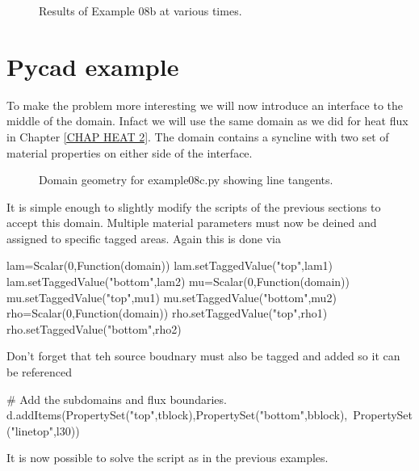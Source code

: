 \begin{figure}[htp]
{\label{fig:ex08pw880}
}
\label{fig:ex08pw}
\caption{Results of Example 08b at various times.}
\end{figure}
\clearpage

\section{Pycad example}
To make the problem more interesting we will now introduce an interface to the
middle of the domain. Infact we will use the same domain as we did for heat flux
in Chapter \ref{CHAP HEAT 2}. The domain contains a syncline with two set of
material properties on either side of the interface.

\begin{figure}[ht]
\begin{center}
\caption{Domain geometry for example08c.py showing line tangents.}
\label{fig:ex08cgeo}
\end{center}
\end{figure}

It is simple enough to slightly modify the scripts of the previous sections to
accept this domain. Multiple material parameters must now be deined and assigned
to specific tagged areas. Again this is done via
\begin{python}
lam=Scalar(0,Function(domain))
lam.setTaggedValue("top",lam1)
lam.setTaggedValue("bottom",lam2)
mu=Scalar(0,Function(domain))
mu.setTaggedValue("top",mu1)
mu.setTaggedValue("bottom",mu2)
rho=Scalar(0,Function(domain))
rho.setTaggedValue("top",rho1)
rho.setTaggedValue("bottom",rho2)
\end{python}
Don't forget that teh source boudnary must also be tagged and added so it can be
referenced 
\begin{python}
# Add the subdomains and flux boundaries.
d.addItems(PropertySet("top",tblock),PropertySet("bottom",bblock),\
                                     PropertySet("linetop",l30))
\end{python}
It is now possible to solve the script as in the previous examples.

